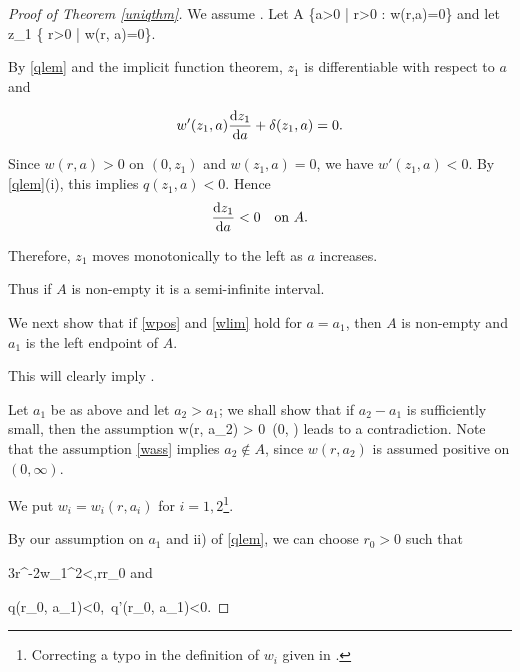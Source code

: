 \begin{proof}[Proof of Theorem \ref{uniqthm}]
    We assume .
    Let
    \be\label{adef}
    A \coloneqq \left\{\;a>0 \;\middle|\; \exists r>0 \;:\; w(r,a)=0\;\right\}
    \ee
    and let
    \be\label{z1def}
    z_1 \coloneqq \inf\left\{\; r>0 \;\middle|\; w(r, a)=0\;\right\}.
    \ee

    By \cref{qlem} and the implicit function theorem, $z_1$ is differentiable
    with respect to $a$ and

    $$w'(z_1, a)\frac{\mathop{}\!\mathrm{d} z_1}{\mathop{}\!\mathrm{d} a} + \delta(z_1, a) = 0.$$

    Since $w(r, a)>0$ on $(0, z_1)$ and $w(z_1, a)=0$, we have $w'(z_1, a)<0$. 
    By \cref{qlem}(i), this implies $q(z_1, a)<0$.  Hence 
    $$\dfrac{\mathop{}\!\mathrm{d} z_1}{\mathop{}\!\mathrm{d} a}<0\quad\text{on}~A.$$ 

    Therefore, $z_1$ moves monotonically to the left as $a$ increases. 

    Thus if $A$ is non-empty it is a semi-infinite interval. 
   
    We next show that if \eqref{wpos} and \eqref{wlim} hold for $a=a_1$, then $A$ is non-empty and
    $a_1$ is the left endpoint of $A$. 

    This will clearly imply .
   
    Let $a_1$ be as above and let $a_2>a_1$; we shall show that if $a_2-a_1$ is
    sufficiently small, then the assumption 
    \be\label{wass} w(r, a_2) > 0\quad{}~(0, \infty)\ee 
    leads to a contradiction. Note that the assumption \eqref{wass} implies  
    $a_2\not\in A$, since $w(r, a_2)$ is assumed positive on $(0, \infty)$.

    We put $w_i=w_i(r, a_i)$ for $i=1, 2$\footnote{Correcting a typo in
    the definition of $w_i$ given in \cite{coffm}.}. 

    By our assumption on $a_1$ and ii) of \cref{qlem}, we can choose $r_0>0$
    such that

    \be\label{ubw1} 3r^{-2}w_1^2<,\quad r\geq r_0\ee
    and

    \be\label{qneg} q(r_0, a_1)<0,\quad{}~q'(r_0, a_1)<0.\ee


\end{proof}

